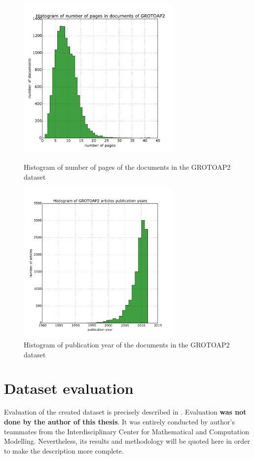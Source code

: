 \begin{figure}
  \centering
\begin{minipage}[t!]{0.45\linewidth}
  \includegraphics[width=8cm]{plots/pages_histogram}
  \caption{Histogram of number of pages of the documents in the GROTOAP2 dataset}
  \label{fig:page_count_histogram}
\end{minipage}
\quad
\begin{minipage}[t!]{0.45\linewidth}
  \includegraphics[width=8cm]{plots/publication_year_histogram}
  \caption{Histogram of publication year of the documents in the GROTOAP2 dataset}
  \label{fig:publication_year_histogram}
\end{minipage}
\end{figure}

\section{Dataset evaluation}
Evaluation of the created dataset is precisely described in \cite{DominikaTkaczykPaweSzostek2014}. Evaluation \textbf{was not done by the author of this thesis}. It was entirely conducted by author's teammates from the Interdisciplinary Center for Mathematical and Computation Modelling. Nevertheless, its results and methodology will be quoted here in order to make the description more complete.

